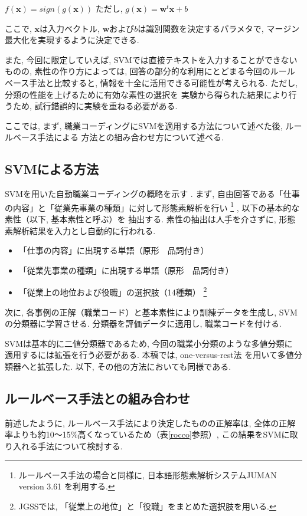 \documentclass{nlp}
\begin{document}
$f(\mathbf{x})=sign(g(\mathbf{x} ))$
ただし, $g(\mathbf{x} )= \mathbf{w}^{t}\mathbf{x}+b$

ここで, $\mathbf{x}$は入力ベクトル, 
$\mathbf{w}$および$b$は識別関数を決定するパラメタで, 
マージン最大化を実現するように決定できる. 

また, 
今回に限定していえば, 
SVMでは直接テキストを入力することができないものの, 
素性の作り方によっては,  
回答の部分的な利用にとどまる今回のルールベース手法と比較すると, 
情報を十全に活用できる可能性が考えられる. 
ただし, 分類の性能を上げるために有効な素性の選択を
実験から得られた結果により行うため, 
試行錯誤的に実験を重ねる必要がある. 

ここでは, まず, 職業コーディングにSVMを適用する方法について述べた後, 
ルールベース手法による
方法との組み合わせ方について述べる. 

\subsection{SVMによる方法}
SVMを用いた自動職業コーディングの概略を示す 
\cite{Takahashi_et_al04a}. 
まず, 自由回答である「仕事の内容」と「従業先事業の種類」に対して形態素解析を行い
\footnote{ルールベース手法の場合と同様に, 
日本語形態素解析システムJUMAN version 3.61 
\cite{Kurohashi98}
を利用する. }
, 
以下の基本的な素性（以下, 基本素性と呼ぶ）を
抽出する. 
素性の抽出は人手を介さずに, 形態素解析結果を入力とし自動的に行われる. 

\begin{itemize}
\item 「仕事の内容」に出現する単語（原形　品詞付き）
\item 「従業先事業の種類」に出現する単語（原形　品詞付き）
\item 「従業上の地位および役職」の選択肢（14種類）
\footnote{JGSSでは, 「従業上の地位」と「役職」をまとめた選択肢を用いる\cite{JGSS02,JGSS03}. }
\end{itemize}

次に, 各事例の正解（職業コード）と基本素性により訓練データを生成し,
SVMの分類器に学習させる. 
分類器を評価データに適用し, 職業コードを付ける. 

SVMは基本的に二値分類器であるため, 今回の職業小分類のような多値分類に
適用するには拡張を行う必要がある. 
本稿では, one-versus-rest法
\cite{kressel99}
を用いて多値分類器へと拡張した. 
以下, その他の方法においても同様である. 

\subsection{ルールベース手法との組み合わせ} 
前述したように, ルールベース手法により決定したものの正解率は, 
全体の正解率よりも約10〜15$\%$高くなっているため（表\ref{rocco}参照）, 
この結果をSVMに取り入れる手法について検討する. 
\end{document}
